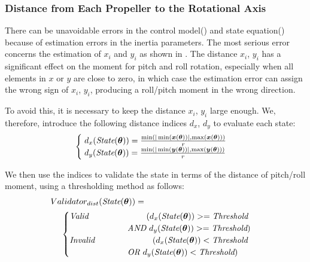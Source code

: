 \subsubsection{Distance from Each Propeller to the Rotational Axis}
There can be unavoidable errors in the control model() and state equation() because of estimation errors in the inertia parameters. The most serious error concerns the estimation of $x_i$ and $y_i$ as shown in . The distance $x_i$, $y_i$ has a significant effect on the moment for pitch and roll rotation, especially when all elements in $x$ or $y$ are close to zero, in which case the estimation error can assign the wrong sign of $x_i$, $y_i$, producing a roll/pitch moment in the wrong direction.
\par
To avoid this, it is necessary to keep the distance $x_i$, $y_i$ large enough. We, therefore, introduce the following distance indices $d_x$, $d_y$ to evaluate each state:
\begin{equation}
  \begin{cases}
    \; d_x(\text{\it{State}}(\bm{\theta})) = \frac{\min(|\min(\bm{x}(\bm{\theta}))|,\max(\bm{x}(\bm{\theta})))}{r}\\
    \; d_y(\text{\it{State}}(\bm{\theta})) = \frac{\min(|\min(\bm{y}(\bm{\theta}))|,\max(\bm{y}(\bm{\theta})))}{r}\\
  \end{cases}
  \label{eq:dx_dy}
\end{equation}
\par
We then use the indices to validate the state in terms of the distance of pitch/roll moment, using a thresholding method as follows:
\begin{equation}
  \begin{split}
  Validator_{dist}(\text{\it{State}}(\bm{\theta}))= \hspace{0.4\columnwidth} \\
  \begin{cases}
  \text{\it{Valid}} \hspace{0.2\columnwidth}(d_x(\text{\it{State}}(\bm{\theta})) >= \text{\it{Threshold}} \\
  \hspace{0.2\columnwidth} \text{\it{AND}} \ d_y(\text{\it{State}}(\bm{\theta})) >= \text{\it{Threshold}})\\
  \text{\it{Invalid}} \hspace{0.2\columnwidth} (d_x(\text{\it{State}}(\bm{\theta})) < \text{\it{Threshold}} \\ 
  \hspace{0.2\columnwidth} \text{\it{OR}} \ d_y(\text{\it{State}}(\bm{\theta})) < \text{\it{Threshold}})
  \end{cases}
  \end{split}
  \label{eq:dx_dy_thresh}
\end{equation}
